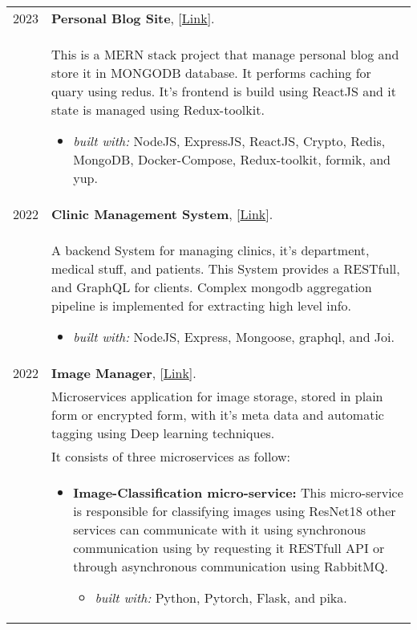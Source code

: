 \documentclass[a4paper,10pt]{article} %
\begin{document}
    \begin{longtable}{r p{16cm}}
        2023  & \textbf{Personal Blog Site}, [\href{https://github.com/zaky-fetoh/Personal-Blog-Site}{Link}].\\&
        This is a MERN stack project that manage personal blog and store it in MONGODB database. It performs caching for quary using redus. It's frontend is build using ReactJS and it state is managed using Redux-toolkit.
        \begin{itemize}
            \item \textit{built with: } NodeJS, ExpressJS,  ReactJS, Crypto, Redis, MongoDB, Docker-Compose, Redux-toolkit, formik, and yup.
        \end{itemize}\\

        2022  & \textbf{Clinic Management System}, [\href{https://github.com/zaky-fetoh/Clinic-Management-System}{Link}].\\&
        A backend System for managing clinics, it's department, medical stuff, and patients. This 	System provides a RESTfull, and GraphQL for clients. Complex mongodb aggregation pipeline 	is implemented for extracting high level info.
        \begin{itemize}
            \item \textit{built with: } NodeJS, Express, Mongoose, graphql, and Joi. 
        \end{itemize}\\


        2022  & \textbf{Image Manager}, [\href{https://github.com/zaky-fetoh/image-maneger-microservices-app}{Link}].  \\& Microservices application for image storage, stored in plain form or encrypted form, with it's meta data and automatic tagging using Deep learning techniques. \\&
        It consists of three microservices as follow:\\&
        \begin{itemize}
            \item \textbf{Image-Classification micro-service:}
            This micro-service is responsible for classifying images using ResNet18 other services can communicate with it using synchronous communication using by 
            requesting it RESTfull API or through asynchronous communication using RabbitMQ.
            \begin{itemize}
                \item \textit{built with: } Python, Pytorch, Flask, and pika.
            \end{itemize}


\end{itemize}
\end{longtable}
\end{document}
